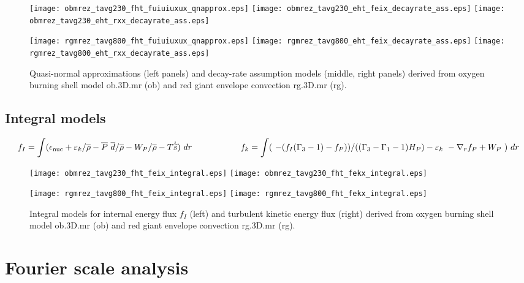 \documentclass[10pt,paper=a4]{report}
\newcommand{\eht}{\overline}
\newcommand{\fht}{\widetilde}
\begin{document}
\begin{figure}[!h]
\centerline{
\texttt{[image: obmrez\_tavg230\_fht\_fuiuiuxux\_qnapprox.eps]}
\texttt{[image: obmrez\_tavg230\_eht\_feix\_decayrate\_ass.eps]}
\texttt{[image: obmrez\_tavg230\_eht\_rxx\_decayrate\_ass.eps]}}

\centerline{
\texttt{[image: rgmrez\_tavg800\_fht\_fuiuiuxux\_qnapprox.eps]}
\texttt{[image: rgmrez\_tavg800\_eht\_feix\_decayrate\_ass.eps]}
\texttt{[image: rgmrez\_tavg800\_eht\_rxx\_decayrate\_ass.eps]}}
\caption{Quasi-normal approximations (left panels) and decay-rate assumption models (middle, right panels) derived from  oxygen burning shell model {\sf ob.3D.mr} (ob) and red giant envelope convection {\sf rg.3D.mr} (rg). \label{fig:qn-dc-models}}
\end{figure}

\newpage

\subsection{Integral models}

\begin{align}
f_I = \int (\epsilon_{\rm nuc} + \varepsilon_k/ \eht{\rho} - \eht{P} \ \eht{d} / \eht{\rho} - W_P / \eht{\rho} - T \dot{\fht{s}}) \ dr \hspace{2.cm} f_k = \int ( \ -(f_I (\Gamma_3 -1) - f_P))/((\Gamma_3-\Gamma_1-1)H_P) - \varepsilon_k \ - \nabla_r f_P + W_P \ ) \ dr \nonumber
\end{align}

\begin{figure}[!h]
\centerline{
\texttt{[image: obmrez\_tavg230\_fht\_feix\_integral.eps]}
\texttt{[image: obmrez\_tavg230\_fht\_fekx\_integral.eps]}}

\centerline{
\texttt{[image: rgmrez\_tavg800\_fht\_feix\_integral.eps]}
\texttt{[image: rgmrez\_tavg800\_fht\_fekx\_integral.eps]}}
\caption{Integral models for internal energy flux $f_I$ (left) and turbulent kinetic energy flux (right) derived from  oxygen burning shell model {\sf ob.3D.mr} (ob) and red giant envelope convection {\sf rg.3D.mr} (rg). \label{fig:integral-models}}
\end{figure}

\newpage

\section{Fourier scale analysis}
\end{document}
